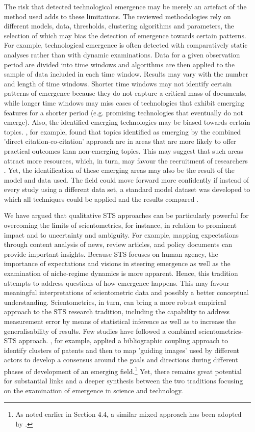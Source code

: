 \documentclass[11pt]{article}
\begin{document}
The risk that detected technological emergence may be merely an artefact of the method used adds to these limitations. The reviewed methodologies rely on different models, data, thresholds, clustering algorithms and parameters, the selection of which may bias the detection of emergence towards certain patterns. For example, technological emergence is often detected with comparatively static analyses rather than with dynamic examinations. Data for a given observation period are divided into time windows and algorithms are then applied to the sample of data included in each time window. Results may vary with the number and length of time windows. Shorter time windows may not identify certain patterns of emergence because they do not capture a critical mass of documents, while longer time windows may miss cases of technologies that exhibit emerging features for a shorter period (e.g. promising technologies that eventually do not emerge). Also, the identified emerging technologies may be biased towards certain topics. \cite{Small2014}, for example, found that topics identified as emerging by the combined 'direct citation-co-citation' approach are in areas that are more likely to offer practical outcomes than non-emerging topics. This may suggest that such areas attract more resources, which, in turn, may favour the recruitment of researchers \citep{Small2014}. Yet, the identification of these emerging areas may also be the result of the model and data used. The field could move forward more confidently if instead of every study using a different data set, a standard model dataset was developed to which all techniques could be applied and the results compared \citep{Katz1996a}.

We have argued that qualitative STS approaches can be particularly powerful for overcoming the limits of scientometrics, for instance, in relation to prominent impact and to uncertainty and ambiguity. For example, mapping expectations through content analysis of news, review articles, and policy documents can provide important insights. Because STS focuses on human agency, the importance of expectations and visions in steering emergence as well as the examination of niche-regime dynamics is more apparent. Hence, this tradition attempts to address questions of how emergence happens. This may favour meaningful interpretations of scientometric data and possibly a better conceptual understanding. Scientometrics, in turn, can bring a more robust empirical approach to the STS research tradition, including the capability to address measurement error by means of statistical inference as well as to increase the generalisability of results. Few studies have followed a combined scientometrics-STS approach. \cite{Kuusi2007}, for example, applied a bibliographic coupling approach to identify clusters of patents and then to map 'guiding images' used by different actors to develop a consensus around the goals and directions during different phases of development of an emerging field.\footnote{As noted earlier in Section 4.4, a similar mixed approach has been adopted by \cite{Gustafsson2015}.} Yet, there remains great potential for substantial links and a deeper synthesis between the two traditions focusing on the examination of emergence in science and technology.
\end{document}

